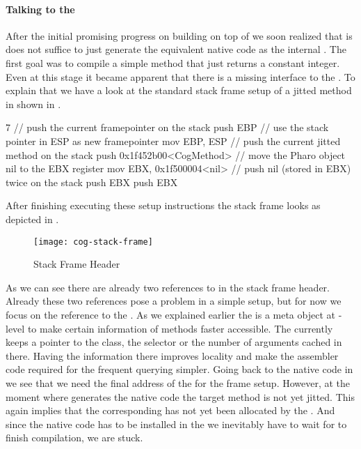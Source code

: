 \paragraph{Talking to the \JIT}
After the initial promising progress on building \NBJ on top of \B we soon realized that is does not suffice to just generate the equivalent native code as the \VM internal \JIT.
The first goal was to compile a simple method that just returns a constant integer.
Even at this stage it became apparent that there is a missing interface to the \JIT.
To explain that we have a look at the standard stack frame setup of a jitted method in \Cog shown in .
%
\begin{numstcode}[
	caption={\Cog \JIT Stackframe Setup},
	label={lst:val-nabujito-cog-frame}]{7}
// push the current framepointer on the stack
push EBP
// use the stack pointer in ESP as new framepointer 
mov  EBP, ESP
// push the current jitted method on the stack
push 0x1f452b00<CogMethod>
// move the Pharo object nil to the EBX register
mov  EBX, 0x1f500004<nil>
// push nil (stored in EBX) twice on the stack
push EBX
push EBX
\end{numstcode} 
%
After finishing executing these setup instructions the stack frame looks as depicted in .
%
\begin{figure}[h]
	\centering
	\texttt{[image: cog-stack-frame]}
	\caption{\Cog Stack Frame Header}
\end{figure}
%
As we can see there are already two references to  in the stack frame header.
Already these two references pose a problem in a simple \NBJ setup, but for now we focus on the reference to the \CogMethod.
As we explained earlier the \CogMethod is a meta object at \JIT-level to make certain information of \PH methods faster accessible.
The \VM currently keeps a pointer to the class, the selector or the number of arguments cached in there.
Having the information there improves locality and make the assembler code required for the frequent querying simpler.
Going back to the native code in  we see that we need the final address of the \CogMethod for the frame setup.
However, at the moment where \NBJ generates the native code the target method is not yet jitted.
This again implies that the corresponding \CogMethod has not yet been allocated by the \JIT.
And since the native code has to be installed in the \JIT we inevitably have to wait for \NBJ to finish compilation, we are stuck.


